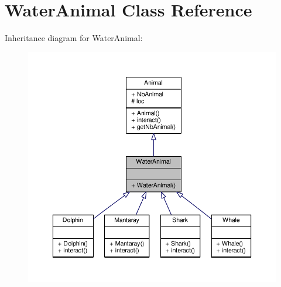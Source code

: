 \hypertarget{classWaterAnimal}{}\section{Water\+Animal Class Reference}
\label{classWaterAnimal}


Inheritance diagram for Water\+Animal\+:
\nopagebreak
\begin{figure}[H]
\begin{center}
\leavevmode
\includegraphics[width=350pt]{classWaterAnimal__inherit__graph}
\end{center}
\end{figure}



